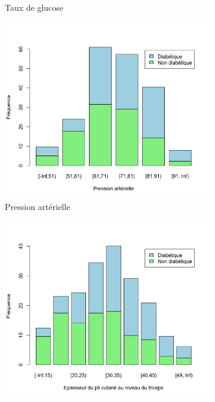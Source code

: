 \documentclass[a4paper,11pt]{report}
\begin{document}
\begin{figure}[H]
\begin{subfigure}[b]{0.25\linewidth}
		\caption{\scriptsize Taux de glucose}
		\label{fig:1-3-2-barplot-freq-diabete-glucose}
	\end{subfigure}%
	\begin{subfigure}[b]{0.25\linewidth}
		\centering
		\captionsetup{justification=centering}
		\includegraphics[width=1\linewidth]{img/1-3-2-barplot-freq-diabete-pression-arterielle}
		\caption{\scriptsize Pression artérielle}
		\label{fig:1-3-2-barplot-freq-diabete-pression-arterielle}
	\end{subfigure}%
	\begin{subfigure}[b]{0.25\linewidth}
		\centering
		\captionsetup{justification=centering}
		\includegraphics[width=1\linewidth]{img/1-3-2-barplot-freq-diabete-pli-cutane}

\end{subfigure}
\end{figure}
\end{document}
